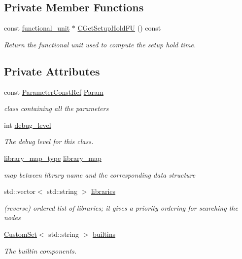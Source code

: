 \subsection*{Private Member Functions}
\begin{DoxyCompactItemize}
\item 
const \hyperlink{structfunctional__unit}{functional\+\_\+unit} $\ast$ \hyperlink{classtechnology__manager_a0bac2f5f755bb68d306334e434ca1d2b}{C\+Get\+Setup\+Hold\+FU} () const
\begin{DoxyCompactList}\small\item\em Return the functional unit used to compute the setup hold time. \end{DoxyCompactList}\end{DoxyCompactItemize}
\subsection*{Private Attributes}
\begin{DoxyCompactItemize}
\item 
const \hyperlink{Parameter_8hpp_a37841774a6fcb479b597fdf8955eb4ea}{Parameter\+Const\+Ref} \hyperlink{classtechnology__manager_a47edc9b47d477c53cde3442aa27dab05}{Param}
\begin{DoxyCompactList}\small\item\em class containing all the parameters \end{DoxyCompactList}\item 
int \hyperlink{classtechnology__manager_a7e86acf1f25325a4ce1e25ac2aca64a8}{debug\+\_\+level}
\begin{DoxyCompactList}\small\item\em The debug level for this class. \end{DoxyCompactList}\item 
\hyperlink{classtechnology__manager_a97826ddbca97f92f63e34c5ef5948319}{library\+\_\+map\+\_\+type} \hyperlink{classtechnology__manager_ae958fbcf7fa0f7837c8da2af7b6b9e69}{library\+\_\+map}
\begin{DoxyCompactList}\small\item\em map between library name and the corresponding data structure \end{DoxyCompactList}\item 
std\+::vector$<$ std\+::string $>$ \hyperlink{classtechnology__manager_a3ca0b8fe373cdba4c0e7a92fe44b1380}{libraries}
\begin{DoxyCompactList}\small\item\em (reverse) ordered list of libraries; it gives a priority ordering for searching the nodes \end{DoxyCompactList}\item 
\hyperlink{custom__set_8hpp_a615bc2f42fc38a4bb1790d12c759e86f}{Custom\+Set}$<$ std\+::string $>$ \hyperlink{classtechnology__manager_a8cfeed1c0e67d56143d76cd67c482fcf}{builtins}
\begin{DoxyCompactList}\small\item\em The builtin components. \end{DoxyCompactList}\end{DoxyCompactItemize}
